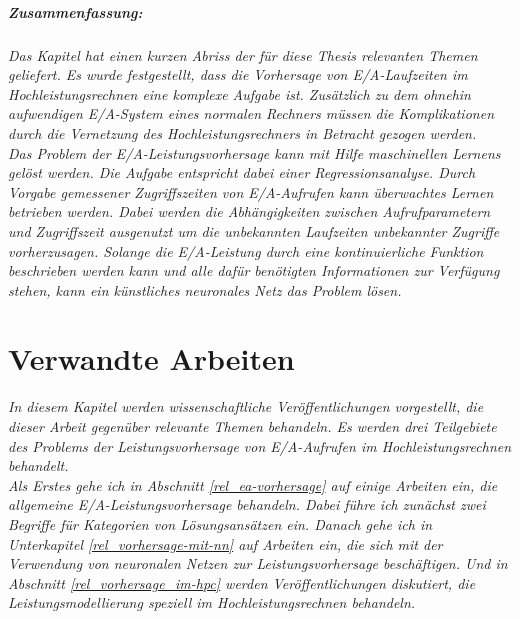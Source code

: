 \documentclass[
	12pt,
	a4paper,
	BCOR10mm,
	DIV14,
	listof=totoc,
	bibliography=totoc,
	headsepline
]{scrreprt}
\begin{document}
\bigskip
\paragraph{Zusammenfassung:}
\textit{ 
	Das Kapitel hat einen kurzen Abriss der für diese Thesis relevanten Themen geliefert. Es wurde festgestellt, dass die Vorhersage von E/A-Laufzeiten im Hochleistungsrechnen eine komplexe Aufgabe ist. Zusätzlich zu dem ohnehin aufwendigen E/A-System eines normalen Rechners müssen die Komplikationen durch die Vernetzung des Hochleistungsrechners in Betracht gezogen werden.\\
	Das Problem der E/A-Leistungsvorhersage kann mit Hilfe maschinellen Lernens gelöst werden. Die Aufgabe entspricht dabei einer Regressionsanalyse. Durch Vorgabe gemessener Zugriffszeiten von E/A-Aufrufen kann überwachtes Lernen betrieben werden. Dabei werden die Abhängigkeiten zwischen Aufrufparametern und Zugriffszeit ausgenutzt um die unbekannten Laufzeiten unbekannter Zugriffe vorherzusagen.
	Solange die E/A-Leistung durch eine kontinuierliche Funktion beschrieben werden kann und alle dafür benötigten Informationen zur Verfügung stehen, kann ein künstliches neuronales Netz das Problem lösen.
}

\chapter{Verwandte Arbeiten}
\textit{%
	In diesem Kapitel werden wissenschaftliche Veröffentlichungen vorgestellt, die dieser Arbeit gegenüber relevante Themen behandeln. Es werden drei Teilgebiete des Problems der Leistungsvorhersage von E/A-Aufrufen im Hochleistungsrechnen behandelt.\\
	Als Erstes gehe ich in Abschnitt \ref{rel_ea-vorhersage} auf einige Arbeiten ein, die allgemeine E/A-Leistungsvorhersage behandeln. Dabei führe ich zunächst zwei Begriffe für Kategorien von Lösungsansätzen ein. Danach gehe ich in Unterkapitel \ref{rel_vorhersage-mit-nn} auf Arbeiten ein, die sich mit der Verwendung von neuronalen Netzen zur Leistungsvorhersage beschäftigen.
	Und in Abschnitt \ref{rel_vorhersage_im-hpc} werden Veröffentlichungen diskutiert, die Leistungsmodellierung speziell im Hochleistungsrechnen behandeln.
}
\bigskip
\end{document}

